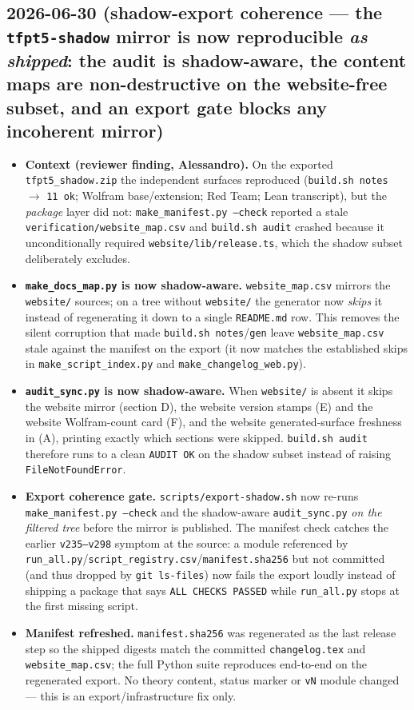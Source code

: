 \subsection*{2026-06-30 (shadow-export coherence --- the \texttt{tfpt5-shadow} mirror is now reproducible \emph{as shipped}: the audit is shadow-aware, the content maps are non-destructive on the website-free subset, and an export gate blocks any incoherent mirror)}
\begin{itemize}
\item \textbf{Context (reviewer finding, Alessandro).} On the exported \texttt{tfpt5\_shadow.zip}
the independent surfaces reproduced (\texttt{build.sh notes} \(\to\) \texttt{11 ok}; Wolfram base/extension;
Red Team; Lean transcript), but the \emph{package} layer did not: \texttt{make\_manifest.py --check}
reported a stale \texttt{verification/website\_map.csv} and \texttt{build.sh audit} crashed because it
unconditionally required \texttt{website/lib/release.ts}, which the shadow subset deliberately excludes.
\item \textbf{\texttt{make\_docs\_map.py} is now shadow-aware.} \texttt{website\_map.csv} mirrors the
\texttt{website/} sources; on a tree without \texttt{website/} the generator now \emph{skips} it instead of
regenerating it down to a single \texttt{README.md} row. This removes the silent corruption that made
\texttt{build.sh notes}/\texttt{gen} leave \texttt{website\_map.csv} stale against the manifest on the export
(it now matches the established skips in \texttt{make\_script\_index.py} and \texttt{make\_changelog\_web.py}).
\item \textbf{\texttt{audit\_sync.py} is now shadow-aware.} When \texttt{website/} is absent it skips the
website mirror (section D), the website version stamps (E) and the website Wolfram-count card (F), and the
website generated-surface freshness in (A), printing exactly which sections were skipped. \texttt{build.sh audit}
therefore runs to a clean \texttt{AUDIT OK} on the shadow subset instead of raising \texttt{FileNotFoundError}.
\item \textbf{Export coherence gate.} \texttt{scripts/export-shadow.sh} now re-runs
\texttt{make\_manifest.py --check} and the shadow-aware \texttt{audit\_sync.py} \emph{on the filtered tree}
before the mirror is published. The manifest check catches the earlier \texttt{v235--v298} symptom at the
source: a module referenced by \texttt{run\_all.py}/\texttt{script\_registry.csv}/\texttt{manifest.sha256} but
not committed (and thus dropped by \texttt{git ls-files}) now fails the export loudly instead of shipping a
package that says \texttt{ALL CHECKS PASSED} while \texttt{run\_all.py} stops at the first missing script.
\item \textbf{Manifest refreshed.} \texttt{manifest.sha256} was regenerated as the last release step so the
shipped digests match the committed \texttt{changelog.tex} and \texttt{website\_map.csv}; the full Python
suite reproduces end-to-end on the regenerated export. No theory content, status marker or \texttt{vN} module
changed --- this is an export/infrastructure fix only.
\end{itemize}

